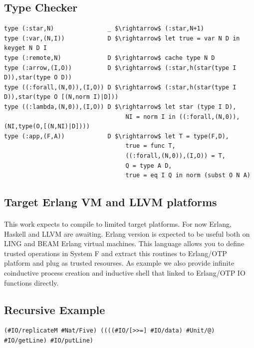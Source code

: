 \documentclass[11pt,oneside]{article}
\begin{document}
   \subsection{Type Checker}

\begin{lstlisting}[mathescape=true]
type (:star,N)               _ $\rightarrow$ (:star,N+1)
type (:var,(N,I))            D $\rightarrow$ let true = var N D in keyget N D I
type (:remote,N)             D $\rightarrow$ cache type N D
type (:arrow,(I,O))          D $\rightarrow$ (:star,h(star(type I D)),star(type O D))
type ((:forall,(N,0)),(I,O)) D $\rightarrow$ (:star,h(star(type I D)),star(type O [(N,norm I)|D]))
type ((:lambda,(N,0)),(I,O)) D $\rightarrow$ let star (type I D),
                                  NI = norm I in ((:forall,(N,0)),(NI,type(O,[(N,NI)|D])))
type (:app,(F,A))            D $\rightarrow$ let T = type(F,D),
                                  true = func T,
                                  ((:forall,(N,0)),(I,O)) = T,
                                  Q = type A D,
                                  true = eq I Q in norm (subst O N A)
\end{lstlisting}


\subsection{Target Erlang VM and LLVM platforms}

\paragraph{}
This work expects to compile to limited target platforms. For now Erlang, Haskell and LLVM are awaiting.
Erlang version is expected to be useful both on LING and BEAM Erlang virtual machines. This language
allows you to define trusted operations in System F and extract this routines to Erlang/OTP platform
and plug as trusted resourses. As example we also provide infinite coinductive process creation
and inductive shell that linked to Erlang/OTP IO functions directly.

\subsection{Recursive Example}

\begin{lstlisting}[mathescape=true]
(#IO/replicateM #Nat/Five) ((((#IO/[>>=] #IO/data) #Unit/@) #IO/getLine) #IO/putLine)
\end{lstlisting}
\end{document}
